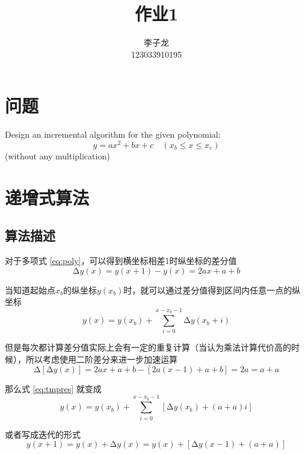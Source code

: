 \documentclass[math-font=newcm]{sjtuarticle}
\title{作业1}
\author{李子龙\\123033910195}
\begin{document}
\maketitle

\tableofcontents*
\clearpage

\section{问题}

Design an incremental algorithm for the given polynomial:
\begin{equation}\label{eq:poly}
    y=ax^2+bx+c\quad(x_b\leq x\leq x_e)
\end{equation}
(without any multiplication)

\section{递增式算法}

\subsection{算法描述}

对于多项式 \eqref{eq:poly}，可以得到横坐标相差1时纵坐标的差分值
\begin{equation}
    \increment y(x)=y(x+1)-y(x)=2ax+a+b
\end{equation}

当知道起始点$x_b$的纵坐标$y(x_b)$时，就可以通过差分值得到区间内任意一点的纵坐标
\begin{equation}\label{eq:tmpres}
    y(x)=y(x_b)+\sum_{i=0}^{x-x_b-1}\increment y(x_b+i)
\end{equation}

但是每次都计算差分值实际上会有一定的重复计算（当认为乘法计算代价高的时候），所以考虑使用二阶差分来进一步加速运算
\begin{equation}
    \increment[\increment y(x)]=2ax+a+b-[2a(x-1)+a+b]=2a=a+a
\end{equation}

那么式 \eqref{eq:tmpres} 就变成
\begin{equation}\label{eq:res}
    y(x)=y(x_b)+\sum_{i=0}^{x-x_b-1}[\increment y(x_b)+(a+a)i]
\end{equation}

或者写成迭代的形式
\begin{equation}
    y(x+1)=y(x)+\increment y(x)=y(x)+[\increment y(x-1)+(a+a)]
\end{equation}
\end{document}
